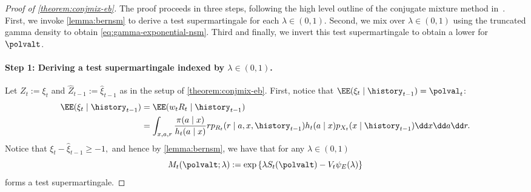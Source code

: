 \begin{proof}[Proof of \cref{theorem:conjmix-eb}]
The proof proceeds in three steps, following the high level outline of the conjugate mixture method in~\cite{howard2018uniform}. First, we invoke \cref{lemma:bernsm} to derive a test supermartingale for each $\lambda \in (0, 1)$. Second, we mix over $\lambda \in (0, 1)$ using the truncated gamma density to obtain \eqref{eq:gamma-exponential-nsm}. Third and finally, we invert this test supermartingale to obtain a lower \cs{} for $\polvalt$.
\paragraph{Step 1: Deriving a test supermartingale indexed by $\lambda \in (0, 1)$.}
    Let $Z_t := \xi_t$ and $\widehat Z_{t-1} := \widehat \xi_{t-1}$ as in the setup of \cref{theorem:conjmix-eb}. First, notice that $\EE(\xi_t \mid \history_{t-1}) = \polval_t$:
    \begin{align}
        \EE(\xi_t \mid \history_{t-1}) &= \EE(w_t R_t \mid \history_{t-1}) \\
        &= \int_{x,a,r} \frac{\pi(a \mid x)}{h_t(a \mid x)} r p_{R_t}(r \mid a, x, \history_{t-1}) h_t(a \mid x) p_{X_t}(x \mid \history_{t-1}) \dd x \dd a \dd r .
    \end{align}
    Notice that
    \(
        \xi_t - \widehat \xi_{t-1} \geq -1,
    \)
    and hence by \cref{lemma:bernsm}, we have that for any $\lambda \in (0, 1)$
    \begin{equation*}
        M_t(\polvalt; \lambda) := \exp \left \{ \lambda S_t(\polvalt) - V_t \psi_E(\lambda) \right \}
    \end{equation*}
    forms a test supermartingale.
    

\end{proof}
